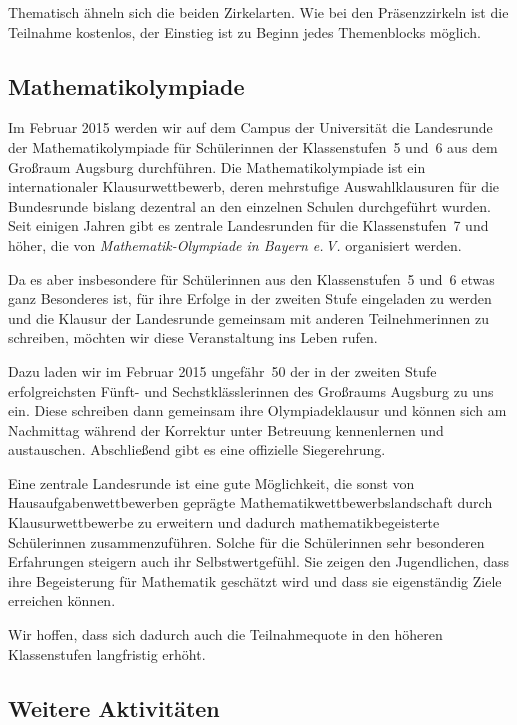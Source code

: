 \documentclass[12pt]{zettel}
\begin{document}
Thematisch ähneln sich die beiden Zirkelarten. Wie bei den
Präsenzzirkeln ist die Teilnahme kostenlos, der Einstieg ist zu Beginn jedes Themenblocks möglich.


\subsection{Mathematikolympiade}

Im Februar 2015 werden wir auf dem Campus der Universität die Landesrunde der Mathematikolympiade für Schülerinnen der Klassenstufen~5 und~6 aus dem Großraum
Augsburg durchführen. Die Mathematikolympiade ist ein internationaler Klausurwettbewerb, deren mehrstufige Auswahlklausuren für die Bundesrunde
bislang dezentral an den einzelnen Schulen durchgeführt wurden. Seit einigen
Jahren gibt es zentrale Landesrunden für die Klassenstufen~7 und höher, die von
\emph{Mathematik-Olympiade in Bayern e.\,V.} organisiert werden.

Da es aber insbesondere für Schülerinnen aus den Klassenstufen~5
und~6 etwas ganz Besonderes ist, für ihre Erfolge in der zweiten Stufe
eingeladen zu werden und die Klausur der Landesrunde gemeinsam mit anderen
Teilnehmerinnen zu schreiben, möchten wir diese Veranstaltung
ins Leben rufen.

Dazu laden wir im Februar 2015 ungefähr~50 der in der zweiten Stufe
erfolgreichsten Fünft- und Sechstklässlerinnen des Großraums
Augsburg zu uns ein. Diese schreiben dann gemeinsam ihre Olympiadeklausur und
können sich am Nachmittag während der Korrektur unter Betreuung kennenlernen
und austauschen. Abschließend gibt es eine offizielle Siegerehrung.

Eine zentrale Landesrunde ist eine gute Möglichkeit, die sonst von
Hausaufgabenwettbewerben geprägte Mathematikwettbewerbslandschaft durch
Klausurwettbewerbe zu erweitern und dadurch mathematikbegeisterte Schülerinnen
zusammenzuführen. Solche für die Schülerinnen
sehr besonderen Erfahrungen steigern auch ihr Selbstwertgefühl. Sie zeigen
den Jugendlichen, dass ihre Begeisterung für Mathematik geschätzt wird und dass sie eigenständig Ziele erreichen können.

Wir hoffen, dass sich dadurch auch die Teilnahmequote
in den höheren Klassenstufen langfristig erhöht.


\subsection{Weitere Aktivitäten}
\end{document}
